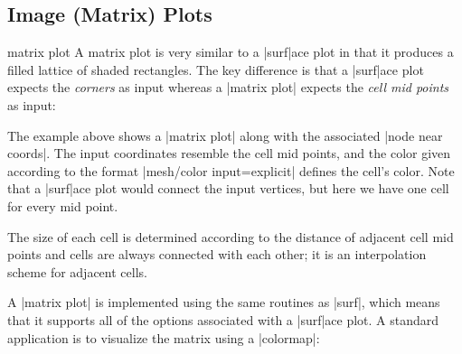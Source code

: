 {\subsection{Image (Matrix) Plots}
\label{sec:imagesc}

\begin{plottype}[/pgfplots]{matrix plot}
	A matrix plot is very similar to a |surf|ace plot in that it produces a filled lattice of shaded rectangles. The key difference is that a |surf|ace plot expects the \emph{corners} as input whereas a |matrix plot| expects the \emph{cell mid points} as input:
\begin{codeexample}[]
\end{codeexample}
	The example above shows a |matrix plot| along with the associated |node near coords|. The input coordinates resemble the cell mid points, and the color given according to the format |mesh/color input=explicit| defines the cell's color. Note that a |surf|ace plot would connect the input vertices, but here we have one cell for every mid point.
	
	The size of each cell is determined according to the distance of adjacent cell mid points and cells are always connected with each other; it is an interpolation scheme for adjacent cells. 

	A |matrix plot| is implemented using the same routines as |surf|, which means that it supports all of the options associated with a |surf|ace plot. A standard application is to visualize the matrix using a |colormap|:
\begin{codeexample}[]
\end{codeexample}
\end{plottype}}

